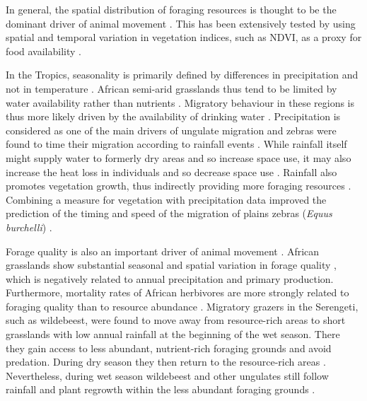 \documentclass[12pt,a4paper, twoside, english]{article}
\begin{document}
In general, the spatial distribution of foraging resources is thought to be the dominant driver of animal movement \citep{Berger2004, Schweiger2015}. This has been extensively tested by using spatial and temporal variation in vegetation indices, such as NDVI, as a proxy for food availability \citep{Fryxell2005, Pettorelli2005, Hebblewhite2008, Mueller2008a, Boettiger2015, Trierweiler2013, Bohrer2014, Bartlam-Brooks2013, Neumann2015a, Teitelbaum2015}.

In the Tropics, seasonality is primarily defined by differences in precipitation and not in temperature \citep{Naidoo2012}. African semi-arid grasslands thus tend to be limited by water availability rather than nutrients \citep{Breman1983}. Migratory behaviour in these regions is thus more likely driven by the availability of drinking water \citep{deBeer2008, Redfern2005}. Precipitation is considered as one of the main drivers of ungulate migration \citep{Bolger2008, Harris2009} and zebras were found to time their migration according to rainfall events \citep{Bartlam-Brooks2011, Naidoo2014}. While rainfall itself might supply water to formerly dry areas and so increase space use, it may also increase the heat loss in individuals and so decrease space use \citep{Rivrud2010, vanBeest2011}. Rainfall also promotes vegetation growth, thus indirectly providing more foraging resources \citep{Okitsu2005}. Combining a measure for vegetation with precipitation data improved the prediction of the timing and speed of the migration of plains zebras (\textit{Equus burchelli}) \citep{Bartlam-Brooks2013}.

Forage quality is also an important driver of animal movement \citep{Berger2004, Schweiger2015}. African grasslands show substantial seasonal and spatial variation in forage quality \citep{Breman1983}, which is negatively related to annual precipitation and primary production. Furthermore, mortality rates of African herbivores are more strongly related to foraging quality than to resource abundance \citep{Fryxell1987, Sinclair1985}. Migratory grazers in the Serengeti, such as wildebeest, were found to move away from resource-rich areas to short grasslands with low annual rainfall at the beginning of the wet season. There they gain access to less abundant, nutrient-rich foraging grounds and avoid predation. During dry season they then return to the resource-rich areas \citep{Fryxell1988, Coughenour1991}. 
Nevertheless, during wet season wildebeest and other ungulates still follow rainfall and plant regrowth within the less abundant foraging grounds \citep{McNaughton1985, Durant1988}.
\end{document}
